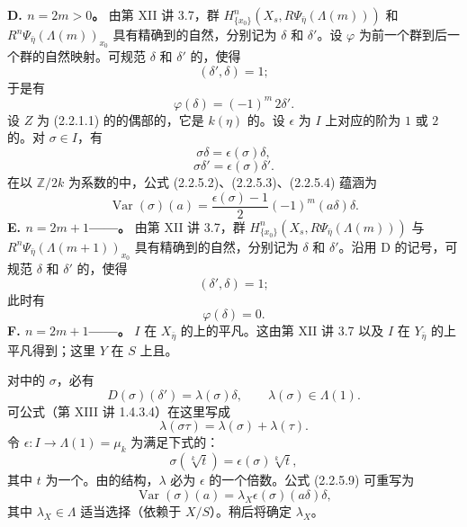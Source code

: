 \textbf{D. $n=2m>0$。}
由第 XII 讲 3.7，群 $H^n_{\{x_0\}}(X_s,R\Psi_{\bar\eta}(\Lambda(m)))$ 和 $R^n\Psi_{\bar\eta}(\Lambda(m))_{x_0}$ 具有精确到的自然，分别记为 $\delta$ 和 $\delta'$。设 $\varphi$ 为前一个群到后一个群的自然映射。可规范 $\delta$ 和 $\delta'$ 的，使得
\[
 (\delta',\delta)=1;\tag{2.2.5.2}
\]
于是有
\[
 \varphi(\delta)=(-1)^m\,2\delta'.\tag{2.2.5.3}
\]
设 $Z$ 为 (2.2.1.1) 的的偶部的，它是 $k(\eta)$ 的。设 $\epsilon$ 为 $I$ 上对应的阶为 $1$ 或 $2$ 的。对 $\sigma\in I$，有
\[
 \sigma\delta=\epsilon(\sigma)\delta,\tag{2.2.5.4}
\]
\[
 \sigma\delta'=\epsilon(\sigma)\delta'.\tag{2.2.5.5}
\]
在以 $\mathbb Z/2k$ 为系数的中，公式 (2.2.5.2)、(2.2.5.3)、(2.2.5.4) 蕴涵为
\[
 \operatorname{Var}(\sigma)(a)=\frac{\epsilon(\sigma)-1}{2}(-1)^m(a\delta)\delta.\tag{2.2.5.6}
\]
\textbf{E. $n=2m+1$——。}
由第 XII 讲 3.7，群 $H^n_{\{x_0\}}(X_s,R\Psi_{\bar\eta}(\Lambda(m)))$ 与 $R^n\Psi_{\bar\eta}(\Lambda(m+1))_{x_0}$ 具有精确到的自然，分别记为 $\delta$ 和 $\delta'$。沿用 D 的记号，可规范 $\delta$ 和 $\delta'$ 的，使得
\[
 (\delta',\delta)=1;\tag{2.2.5.7}
\]
此时有
\[
 \varphi(\delta)=0.\tag{2.2.5.8}
\]
\textbf{F. $n=2m+1$——。}
 $I$ 在 $X_{\bar\eta}$ 的上的平凡。这由第 XII 讲 3.7 以及 $I$ 在 $Y_{\bar\eta}$ 的上平凡得到；这里 $Y$ 在 $S$ 上且。

对中的 $\sigma$，必有
\[
 D(\sigma)(\delta')=\lambda(\sigma)\delta,\qquad\lambda(\sigma)\in\Lambda(1).\tag{2.2.5.9}
\]
可公式（第 XIII 讲 1.4.3.4）在这里写成
\[
 \lambda(\sigma\tau)=\lambda(\sigma)+\lambda(\tau).
\]
令 $\epsilon:I\to\Lambda(1)=\mu_k$ 为满足下式的：
\[
 \sigma(\sqrt[k]{t})=\epsilon(\sigma)\sqrt[k]{t},
\]
其中 $t$ 为一个。由的结构，$\lambda$ 必为 $\epsilon$ 的一个倍数。公式 (2.2.5.9) 可重写为
\[
 \operatorname{Var}(\sigma)(a)=\lambda_X\epsilon(\sigma)(a\delta)\delta,\tag{2.2.5.10}
\]
其中 $\lambda_X\in\Lambda$ 适当选择（依赖于 $X/S$）。稍后将确定 $\lambda_X$。

